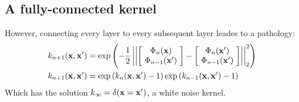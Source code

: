 \documentclass{article}
\begin{document}
\subsection{A fully-connected kernel}
However, connecting every layer to every subsequent layer leades to a pathology:
\begin{align}
k_{n+1}({\bf{x}}, {\bf{x}}') & = \exp \left( -\frac{1}{2} \left|\left| \left[ \! \begin{array}{c} \Phi_n({\bf{x}}) \\ \Phi_{n-1}({\bf{x}}') \end{array} \! \right]  - \left[ \! \begin{array}{c} \Phi_n({\bf{x}}') \\ \Phi_{n-1}({\bf{x}}') \end{array} \! \right] \right| \right|_2^2 \right) \\
k_{n+1}({\bf{x}}, {\bf{x}}') & = \exp \left( k_n({\bf{x}}, {\bf{x}}') - 1 \right) \exp \left( k_{n-1}({\bf{x}}, {\bf{x}}') - 1 \right)
\end{align}
Which has the solution $k_\infty = \delta( {\bf{x}} = {\bf{x}}' )$, a white noise kernel.


\end{document}
